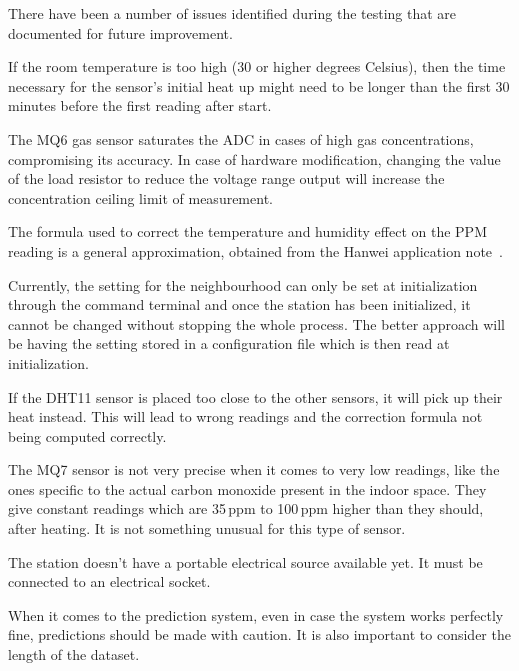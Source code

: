 There have been a number of issues identified during the testing that are documented for future
improvement.

If the room temperature is too high (30 or higher degrees Celsius), then the time necessary
for the sensor's initial heat up might need to be longer than the first 30 minutes before the
first reading after start.

The MQ6 gas sensor saturates the ADC in cases of high gas concentrations, compromising its
accuracy. In case of hardware modification, changing the value of the load resistor to reduce
the voltage range output will increase the concentration ceiling limit of measurement.

The formula used to correct the temperature and humidity effect on the PPM reading is a general
approximation, obtained from the Hanwei application note~\cite{hanwei}.

Currently, the setting for the neighbourhood can only be set at initialization through the
command terminal and once the station has been initialized, it cannot be changed without
stopping the whole process. The better approach will be having the setting stored in a
configuration file which is then read at initialization.

If the DHT11 sensor is placed too close to the other sensors, it will pick up their heat
instead. This will lead to wrong readings and the correction formula not being computed
correctly.

The MQ7 sensor is not very precise when it comes to very low readings, like the ones specific
to the actual carbon monoxide present in the indoor space. They give constant readings which
are 35\,ppm to 100\,ppm higher than they should, after heating. It is not something unusual
for this type of sensor.

The station doesn't have a portable electrical source available yet. It must be connected to
an electrical socket.

When it comes to the prediction system, even in case the system works perfectly fine,
predictions should be made with caution. It is also important to consider the length of the
dataset.
